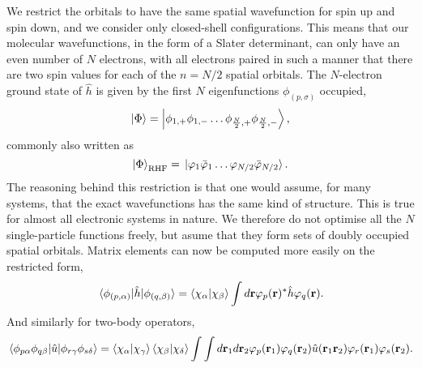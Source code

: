 We restrict the orbitals to have the same spatial wavefunction for spin up and spin
down, and we consider only closed-shell configurations. This means that our 
molecular wavefunctions, in the form of a Slater determinant, can only have an 
even number of $N$ electrons, with all electrons paired in such a manner that there 
are two spin values for each of the $n=N/2$ spatial orbitals. The $N$-electron 
ground state of $\hat{h}$ is given by the first $N$ eigenfunctions $\phi_{(p,\sigma)}$
occupied,
\begin{equation}
    \ket{\Phi} = \ket{\phi_{1,+}\phi_{1,-}\dots \phi_{\frac{N}{2},+}\phi_{\frac{N}{2},-}},
\end{equation}
commonly also written as 
\begin{equation}
    \ket{\Phi}_{\text{RHF}} = 
    \ket*{\varphi_1 \bar{\varphi}_1 \dots \varphi_{N/2} \bar{\varphi}_{N/2}}.
\end{equation}
The reasoning behind this restriction is that one would assume, for many systems, that 
the exact wavefunctions has the same kind of structure. This is true for almost all 
electronic systems in nature. We therefore do not optimise all the $N$ single-particle 
functions freely, but asume that they form sets of doubly occupied spatial orbitals. 
Matrix elements can now be computed more easily on the restricted form,
\begin{equation}
    \mel*{\phi_{(p,\alpha)}}{\hat{h}}{\phi_{(q,\beta)}} 
    = \braket{\chi_\alpha}{\chi_\beta}
        \int d\vb{r} \varphi_p(\vb{r})^*\hat{h}\varphi_q(\vb{r}).
\end{equation}
And similarly for two-body operators,
\begin{equation}
    \mel{\phi_{p\alpha}\phi_{q\beta}}{\hat{u}}{\phi_{r\gamma}\phi_{s\delta}}
    = \braket{\chi_\alpha}{\chi_\gamma}\braket{\chi_\beta}{\chi_\delta}
        \int \int d \vb{r}_1 d \vb{r}_2 \varphi_p(\vb{r}_1)\varphi_q(\vb{r}_2)
            \hat{u}(\vb{r}_1 \vb{r}_2) \varphi_r(\vb{r}_1)\varphi_s(\vb{r}_2).
\end{equation}

